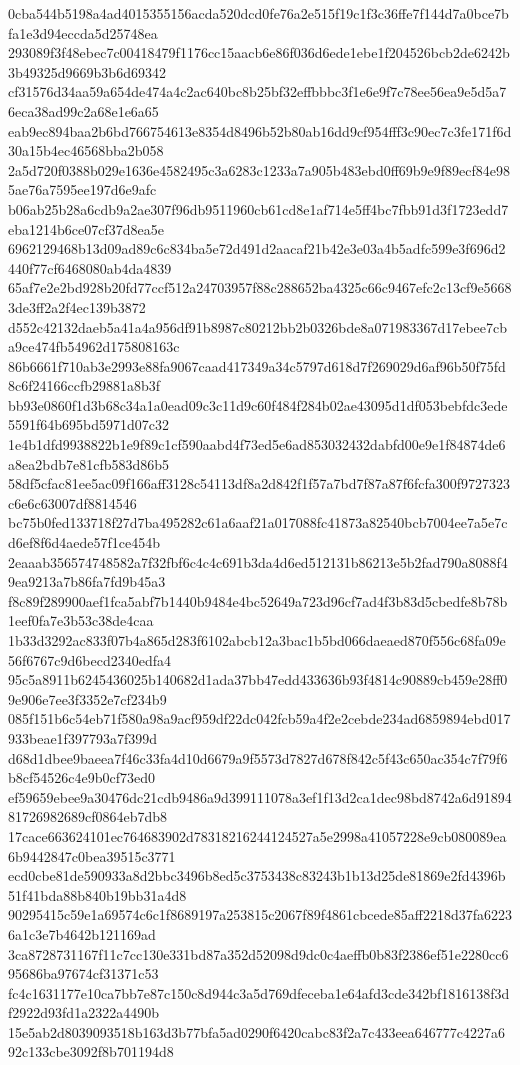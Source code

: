 {0cba544b5198a4ad4015355156acda520dcd0fe76a2e515f19c1f3c36ffe7f144d7a0bce7bfa1e3d94eccda5d25748ea
293089f3f48ebec7c00418479f1176cc15aacb6e86f036d6ede1ebe1f204526bcb2de6242b3b49325d9669b3b6d69342
cf31576d34aa59a654de474a4c2ac640bc8b25bf32effbbbc3f1e6e9f7c78ee56ea9e5d5a76eca38ad99c2a68e1e6a65
eab9ec894baa2b6bd766754613e8354d8496b52b80ab16dd9cf954fff3c90ec7c3fe171f6d30a15b4ec46568bba2b058
2a5d720f0388b029e1636e4582495c3a6283c1233a7a905b483ebd0ff69b9e9f89ecf84e985ae76a7595ee197d6e9afc
b06ab25b28a6cdb9a2ae307f96db9511960cb61cd8e1af714e5ff4bc7fbb91d3f1723edd7eba1214b6ce07cf37d8ea5e
6962129468b13d09ad89c6c834ba5e72d491d2aacaf21b42e3e03a4b5adfc599e3f696d2440f77cf6468080ab4da4839
65af7e2e2bd928b20fd77ccf512a24703957f88c288652ba4325c66c9467efc2c13cf9e56683de3ff2a2f4ec139b3872
d552c42132daeb5a41a4a956df91b8987c80212bb2b0326bde8a071983367d17ebee7cba9ce474fb54962d175808163c
86b6661f710ab3e2993e88fa9067caad417349a34c5797d618d7f269029d6af96b50f75fd8c6f24166ccfb29881a8b3f
bb93e0860f1d3b68c34a1a0ead09c3c11d9c60f484f284b02ae43095d1df053bebfdc3ede5591f64b695bd5971d07c32
1e4b1dfd9938822b1e9f89c1cf590aabd4f73ed5e6ad853032432dabfd00e9e1f84874de6a8ea2bdb7e81cfb583d86b5
58df5cfac81ee5ac09f166aff3128c54113df8a2d842f1f57a7bd7f87a87f6fcfa300f9727323c6e6c63007df8814546
bc75b0fed133718f27d7ba495282c61a6aaf21a017088fc41873a82540bcb7004ee7a5e7cd6ef8f6d4aede57f1ce454b
2eaaab356574748582a7f32fbf6c4c4c691b3da4d6ed512131b86213e5b2fad790a8088f49ea9213a7b86fa7fd9b45a3
f8c89f289900aef1fca5abf7b1440b9484e4bc52649a723d96cf7ad4f3b83d5cbedfe8b78b1eef0fa7e3b53c38de4caa
1b33d3292ac833f07b4a865d283f6102abcb12a3bac1b5bd066daeaed870f556c68fa09e56f6767c9d6becd2340edfa4
95c5a8911b6245436025b140682d1ada37bb47edd433636b93f4814c90889cb459e28ff09e906e7ee3f3352e7cf234b9
085f151b6c54eb71f580a98a9acf959df22dc042fcb59a4f2e2cebde234ad6859894ebd017933beae1f397793a7f399d
d68d1dbee9baeea7f46c33fa4d10d6679a9f5573d7827d678f842c5f43c650ac354c7f79f6b8cf54526c4e9b0cf73ed0
ef59659ebee9a30476dc21cdb9486a9d399111078a3ef1f13d2ca1dec98bd8742a6d9189481726982689cf0864eb7db8
17cace663624101ec764683902d78318216244124527a5e2998a41057228e9cb080089ea6b9442847c0bea39515c3771
ecd0cbe81de590933a8d2bbc3496b8ed5c3753438c83243b1b13d25de81869e2fd4396b51f41bda88b840b19bb31a4d8
90295415c59e1a69574c6c1f8689197a253815c2067f89f4861cbcede85aff2218d37fa62236a1c3e7b4642b121169ad
3ca8728731167f11c7cc130e331bd87a352d52098d9dc0c4aeffb0b83f2386ef51e2280cc695686ba97674cf31371c53
fc4c1631177e10ca7bb7e87c150c8d944c3a5d769dfeceba1e64afd3cde342bf1816138f3df2922d93fd1a2322a4490b
15e5ab2d8039093518b163d3b77bfa5ad0290f6420cabc83f2a7c433eea646777c4227a692c133cbe3092f8b701194d8
}
